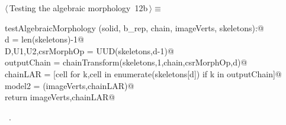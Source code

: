 \documentclass[11pt,oneside]{article}	%
\begin{document}
\begin{flushleft} \small
\begin{minipage}{\linewidth} \label{scrap19}
\protect{}$\langle\,$Testing the algebraic morphology\nobreak\ {\footnotesize 12b}$\,\rangle\equiv$
\vspace{-1ex}
\begin{list}{}{} \item
\mbox{}\verb@def testAlgebraicMorphology (solid, b_rep, chain, imageVerts, skeletons):@\\
\mbox{}\verb@   d = len(skeletons)-1@\\
\mbox{}\verb@   D,U1,U2,csrMorphOp = UUD(skeletons,d-1)@\\
\mbox{}\verb@   outputChain = chainTransform(skeletons,1,chain,csrMorphOp,d)@\\
\mbox{}\verb@   chainLAR = [cell for k,cell in enumerate(skeletons[d]) if k in outputChain]@\\
\mbox{}\verb@   model2 = (imageVerts,chainLAR)@\\
\mbox{}\verb@   return imageVerts,chainLAR@\\
\mbox{}\verb@@{\NWsep}
\end{list}
\vspace{-1ex}
\footnotesize\addtolength{\baselineskip}{-1ex}
\begin{list}{}{\setlength{\itemsep}{-\parsep}\setlength{\itemindent}{-\leftmargin}}
\item \NWtxtMacroRefIn\ .
\end{list}
\end{minipage}\\[4ex]
\end{flushleft}
\end{document}
